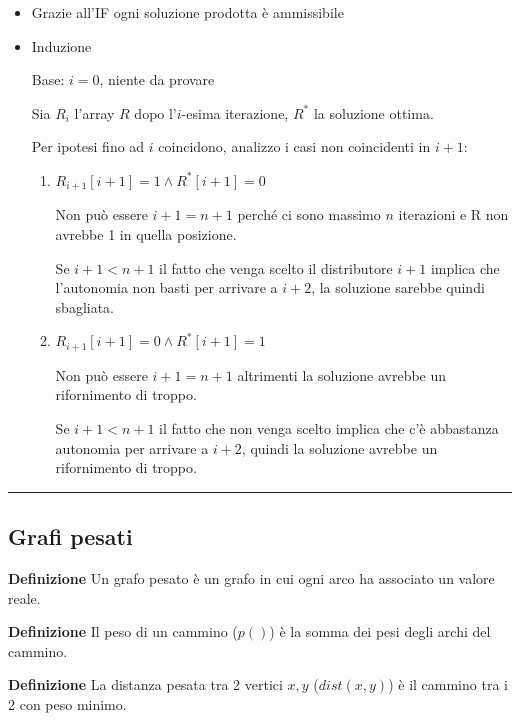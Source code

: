 \documentclass{article}
\begin{document}
\begin{itemize}
    \item Grazie all'IF ogni soluzione prodotta è ammissibile
    \item Induzione

        Base: $i=0$, niente da provare

        Sia $R_i$ l'array $R$ dopo l'$i$-esima iterazione, $R^*$ la soluzione ottima.

        Per ipotesi fino ad $i$ coincidono, analizzo i casi non coincidenti in $i+1$:
        \begin{enumerate}
            \item $R_{i+1}[i+1]=1\wedge R^*[i+1]=0$

                Non può essere $i+1=n+1$ perché ci sono massimo $n$ iterazioni e R non avrebbe 1 in quella posizione.

                Se $i+1<n+1$ il fatto che venga scelto il distributore $i+1$ implica che l'autonomia non basti per arrivare a $i+2$, la soluzione sarebbe quindi sbagliata.

            \item $R_{i+1}[i+1]=0\wedge R^*[i+1]=1$

                Non può essere $i+1=n+1$ altrimenti la soluzione avrebbe un rifornimento di troppo. 
                
                Se $i+1<n+1$ il fatto che non venga scelto implica che c'è abbastanza autonomia per arrivare a $i+2$, quindi la soluzione avrebbe un rifornimento di troppo.
            
        \end{enumerate}
    
\end{itemize}

\noindent\rule{\textwidth}{0.5pt}

\subsection{Grafi pesati}

\textbf{Definizione} Un grafo pesato è un grafo in cui ogni arco ha associato un valore reale.\newline

\noindent\textbf{Definizione} Il peso di un cammino ($p()$) è la somma dei pesi degli archi del cammino.\newline

\noindent\textbf{Definizione} La distanza pesata tra 2 vertici $x,y$ ($dist(x,y)$) è il cammino tra i 2 con peso minimo.
    
\end{document}

